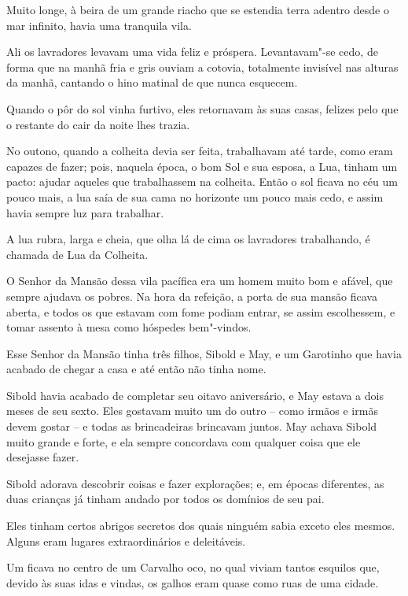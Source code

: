  

Muito longe, à beira de um grande riacho que se estendia terra adentro
desde o mar infinito, havia uma tranquila vila.

Ali os lavradores levavam uma vida feliz e próspera. Levantavam"-se
cedo, de forma que na manhã fria e gris ouviam a cotovia, totalmente
invisível nas alturas da manhã, cantando o hino matinal de que nunca
esquecem.

Quando o pôr do sol vinha furtivo, eles retornavam às suas casas,
felizes pelo que o restante do cair da noite lhes trazia.

No outono, quando a colheita devia ser feita, trabalhavam até tarde,
como eram capazes de fazer; pois, naquela época, o bom Sol e sua esposa,
a Lua, tinham um pacto: ajudar aqueles que trabalhassem na colheita.
Então o sol ficava no céu um pouco mais, a lua saía de sua cama no
horizonte um pouco mais cedo, e assim havia sempre luz para trabalhar.

A lua rubra, larga e cheia, que olha lá de cima os lavradores
trabalhando, é chamada de Lua da Colheita.

O Senhor da Mansão dessa vila pacífica era um homem muito bom e afável,
que sempre ajudava os pobres. Na hora da refeição, a porta de sua mansão
ficava aberta, e todos os que estavam com fome podiam entrar, se assim
escolhessem, e tomar assento à mesa como hóspedes bem"-vindos.

Esse Senhor da Mansão tinha três filhos, Sibold e May, e um Garotinho
que havia acabado de chegar a casa e até então não tinha nome.

Sibold havia acabado de completar seu oitavo aniversário, e May estava a
dois meses de seu sexto. Eles gostavam muito um do outro -- como irmãos
e irmãs devem gostar -- e todas as brincadeiras brincavam juntos. May
achava Sibold muito grande e forte, e ela sempre concordava com qualquer coisa que
ele desejasse fazer.

Sibold adorava descobrir coisas e fazer explorações; e, em épocas
diferentes, as duas crianças já tinham andado por todos os domínios de
seu pai.

Eles tinham certos abrigos secretos dos quais ninguém sabia exceto eles
mesmos. Alguns eram lugares extraordinários e deleitáveis.

Um ficava no centro de um Carvalho oco, no qual viviam tantos esquilos
que, devido às suas idas e vindas, os galhos eram quase como ruas de uma
cidade.

